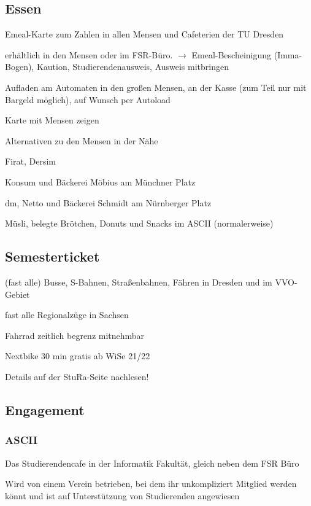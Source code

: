 \documentclass[a4paper,12pt]{scrreprt}
\begin{document}
\subsection{Essen}
\begin{itemize*}
    \item Emeal-Karte zum Zahlen in allen Mensen und Cafeterien der TU Dresden
    \item erhältlich in den Mensen oder im FSR-Büro.
    $\rightarrow$ Emeal-Bescheinigung (Imma-Bogen),  Kaution, Studierendenausweis, Ausweis mitbringen
    \item Aufladen am Automaten in den großen Mensen, an der Kasse (zum Teil nur mit Bargeld möglich), auf Wunsch per Autoload
    \item Karte mit Mensen zeigen
    \item Alternativen zu den Mensen in der Nähe
    \begin{itemize*}
        \item Firat, Dersim
        \item Konsum und Bäckerei Möbius am Münchner Platz
        \item dm, Netto und Bäckerei Schmidt am Nürnberger Platz
        \item Müsli, belegte Brötchen, Donuts und Snacks im ASCII (normalerweise)
    \end{itemize*}
\end{itemize*}

\subsection{Semesterticket}
\begin{itemize*}
    \item (fast alle) Busse, S-Bahnen, Straßenbahnen, Fähren in Dresden und im VVO-Gebiet
    \item fast alle Regionalzüge in Sachsen
    \item Fahrrad zeitlich begrenz mitnehmbar
    \item Nextbike 30 min gratis ab WiSe 21/22
    \item Details auf der StuRa-Seite nachlesen!
\end{itemize*}

\subsection{Engagement}

\subsubsection{ASCII}
\begin{itemize*}
    \item Das Studierendencafe in der Informatik Fakultät, gleich neben dem FSR Büro
    \item Wird von einem Verein betrieben, bei dem ihr unkompliziert Mitglied werden könnt und ist auf Unterstützung von Studierenden angewiesen
\end{itemize*}
\end{document}
